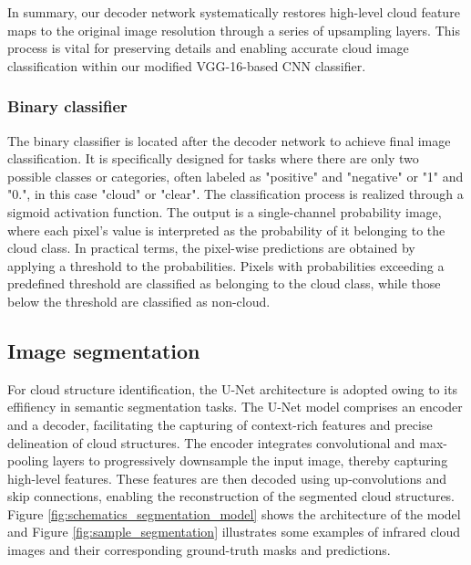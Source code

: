 \documentclass[amt, article]{copernicus}
\begin{document}
In summary, our decoder network systematically restores high-level cloud feature maps to the original image resolution through a series of upsampling layers. This process is vital for preserving details and enabling accurate cloud image classification within our modified VGG-16-based CNN classifier.

\subsubsection{Binary classifier}

The binary classifier is located after the decoder network to achieve final image classification. It is specifically designed for tasks where there are only two possible classes or categories, often labeled as "positive" and "negative" or "1" and "0.", in this case "cloud" or "clear". The classification process is realized through a sigmoid activation function. The output is a single-channel probability image, where each pixel's value is interpreted as the probability of it belonging to the cloud class. In practical terms, the pixel-wise predictions are obtained by applying a threshold to the probabilities. Pixels with probabilities exceeding a predefined threshold are classified as belonging to the cloud class, while those below the threshold are classified as non-cloud.


\subsection{Image segmentation}

For cloud structure identification, the U-Net architecture is adopted owing to its effifiency in semantic segmentation tasks. The U-Net model comprises an encoder and a decoder, facilitating the capturing of context-rich features and precise delineation of cloud structures. The encoder integrates convolutional and max-pooling layers to progressively downsample the input image, thereby capturing high-level features. These features are then decoded using up-convolutions and skip connections, enabling the reconstruction of the segmented cloud structures. Figure \ref{fig:schematics_segmentation_model} shows the architecture of the model and Figure \ref{fig:sample_segmentation} illustrates some examples of infrared cloud images and their corresponding ground-truth masks and predictions. 
\end{document}
